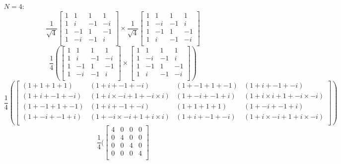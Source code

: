 \documentclass[11pt]{article}
\begin{document}
\begin{itemize}
\newpage
\item[$N = 4$:] 
	$$\frac{1}{\sqrt{4}}
	\begin{bmatrix}
		1 & 1 & 1 & 1 \\
		1 & i & -1  & -i \\
		1 & -1 & 1 & -1 \\
		1 & -i & -1 & i \\
	\end{bmatrix} 
	\times
	\frac{1}{\sqrt{4}}
	\begin{bmatrix}
		1 & 1 & 1 & 1 \\
		1 & -i & -1  & i \\
		1 & -1 & 1 & -1 \\
		1 & i & -1 & -i \\
	\end{bmatrix} 
	$$
	$$\frac{1}{4}(
	\begin{bmatrix}
		1 & 1 & 1 & 1 \\
		1 & i & -1  & -i \\
		1 & -1 & 1 & -1 \\
		1 & -i & -1 & i \\
	\end{bmatrix} 
	\times
	\begin{bmatrix}
		1 & 1 & 1 & 1 \\
		1 & -i & -1  & i \\
		1 & -1 & 1 & -1 \\
		1 & i & -1 & -i \\
	\end{bmatrix})
	$$
	$$
	\frac{1}{4}(
	\begin{bmatrix}
	(1 + 1 + 1 + 1) & (1 + i + -1 + -i) & (1 + -1 + 1 + -1) & (1 + i + -1 + -i) \\
	(1 + i + -1 + -i) & (1 + i \times -i + 1 + -i \times i) & (1 + -i + -1 + i) & (1 + i \times i + 1 + -i \times -i) \\
	(1 + -1 + 1 + -1) & (1 + i + -1 + -i) & (1 + 1 + 1 + 1) & (1 + -i + -1 + i) \\
	(1 + -i + -1 + i) & (1 + -i \times -i + 1 + i \times i) & (1 + i + -1 + -i) & (1 + i \times -i + 1 + i \times -i) \\
	\end{bmatrix}
	)
	$$
	$$
	\frac{1}{4}(
	\begin{bmatrix}
	4 & 0 & 0 & 0 \\
	0 & 4 & 0 & 0 \\
	0 & 0 & 4 & 0 \\
	0 & 0 & 0 & 4 \\

\end{bmatrix}$$
\end{itemize}
\end{document}
